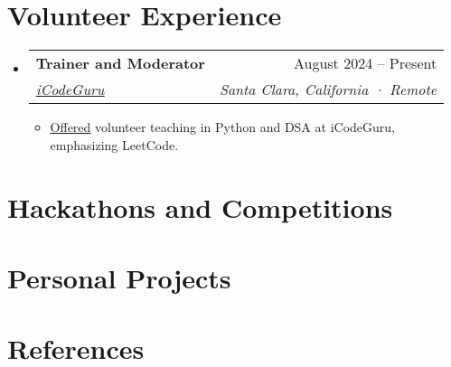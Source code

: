 \documentclass[letterpaper,11pt]{article}
\makeatletter
\newcommand{\resumeItem}[1]{
  \item\small{
    {#1 \vspace{-2pt}}
  }
}
\newcommand{\resumeSubheading}[4]{
  \vspace{-2pt}\item
    \begin{tabular*}{0.97\textwidth}[t]{l@{\extracolsep{\fill}}r}
      \textbf{#1} & #2 \\
      \textit{\small#3} & \textit{\small #4} \\
    \end{tabular*}\vspace{-7pt}
}
\newcommand{\resumeSubHeadingListStart}{\begin{itemize}[leftmargin=0.15in, label={}]}
\newcommand{\resumeSubHeadingListEnd}{\end{itemize}}
\newcommand{\resumeItemListStart}{\begin{itemize}}
\newcommand{\resumeItemListEnd}{\end{itemize}\vspace{-5pt}}
\makeatother
\begin{document}
\section{\textbf{Volunteer Experience}}
\resumeSubHeadingListStart

\resumeSubheading
{Trainer and Moderator}{August 2024 -- Present}
{{\href{https://www.linkedin.com/company/icode-guru/mycompany/}{\underline{iCodeGuru}}}}{Santa Clara, California · Remote}

\resumeItemListStart

\resumeItem{{\href{https://github.com/Ahmadjajja/LeetCode_Volunteer_Teaching}{\underline{Offered}}} volunteer teaching in Python and DSA at iCodeGuru, emphasizing LeetCode.}

\resumeItemListEnd

\resumeSubHeadingListEnd
%



\section{\textbf{Hackathons and Competitions}}
\resumeSubHeadingListStart

%

\resumeSubHeadingListEnd
%

\section{\textbf{Personal Projects}}
\resumeSubHeadingListStart

%

\resumeSubHeadingListEnd


\section{\textbf{References}}
\resumeSubHeadingListStart

%

\resumeSubHeadingListEnd

%

\end{document}
